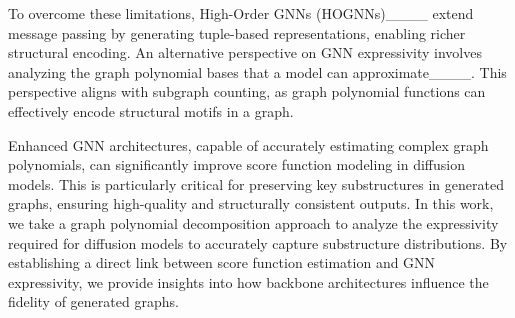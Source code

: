 To overcome these limitations, High-Order GNNs (HOGNNs)____ extend message passing by generating tuple-based representations, enabling richer structural encoding. An alternative perspective on GNN expressivity involves analyzing the graph polynomial bases that a model can approximate____. This perspective aligns with subgraph counting, as graph polynomial functions can effectively encode structural motifs in a graph.  

Enhanced GNN architectures, capable of accurately estimating complex graph polynomials, can significantly improve score function modeling in diffusion models. This is particularly critical for preserving key substructures in generated graphs, ensuring high-quality and structurally consistent outputs. In this work, we take a graph polynomial decomposition approach to analyze the expressivity required for diffusion models to accurately capture substructure distributions. By establishing a direct link between score function estimation and GNN expressivity, we provide insights into how backbone architectures influence the fidelity of generated graphs.
